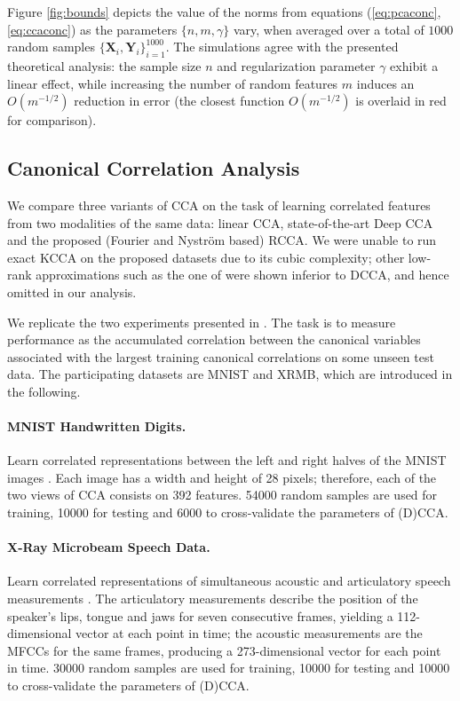 \documentclass{article}
\begin{document}
  Figure \ref{fig:bounds} depicts the value of the norms from equations
  (\ref{eq:pcaconc}, \ref{eq:ccaconc}) as the parameters $\{n,m,\gamma\}$ vary,
  when averaged over a total of $1000$ random samples $\{\bm X_i, \bm
  Y_i\}_{i=1}^{1000}$. The simulations agree with the presented theoretical
  analysis: the sample size $n$ and regularization parameter $\gamma$ exhibit a
  linear effect, while increasing the number of random features $m$ induces an
  $O(m^{-1/2})$ reduction in error (the closest function $O(m^{-1/2})$ is
  overlaid in red for comparison).
  
  \subsection{Canonical Correlation Analysis}
  We compare three variants of CCA on the task of learning correlated features
  from two modalities of the same data: linear CCA, state-of-the-art Deep CCA
  \citep{Galen13} and the proposed (Fourier and Nystr\"om based) RCCA. We were
  unable to run exact KCCA on the proposed datasets due to its cubic
  complexity; other low-rank approximations such as the one of \citet{Arora12}
  were shown inferior to DCCA, and hence omitted in our analysis. 

  We replicate the two experiments presented in \citet{Galen13}.  The task is
  to measure performance as the accumulated correlation between the canonical
  variables associated with the largest training canonical correlations on some
  unseen test data.  The participating datasets are MNIST and XRMB, which are
  introduced in the following.

  \paragraph{MNIST Handwritten Digits.} Learn correlated representations
  between the left and right halves of the MNIST images \citep{LeCun98}.  Each
  image has a width and height of 28 pixels; therefore, each of the two views
  of CCA consists on 392 features. 54000 random samples are used for training,
  10000 for testing and 6000 to cross-validate the parameters of 
  (D)CCA.

  \paragraph{X-Ray Microbeam Speech Data.} Learn correlated representations of
  simultaneous acoustic and articulatory speech measurements \citep{Westbury94}.
  The articulatory measurements describe the position of the speaker's lips,
  tongue and jaws for seven consecutive frames, yielding a 112-dimensional
  vector at each point in time; the acoustic measurements are 
  the MFCCs for the same frames, producing a
  273-dimensional vector for each point in time. 30000 random samples are used
  for training, 10000 for testing and 10000 to cross-validate the parameters of
  (D)CCA.
\end{document}

